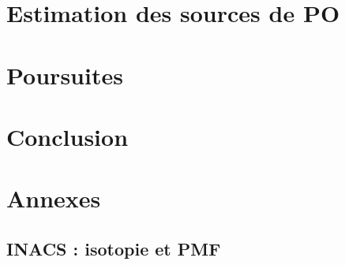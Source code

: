 \documentclass[a4paper,11pt]{book}
\begin{document}
\chapter{Estimation des sources de PO}
\label{cha:estimation_des_sources_de_PO}
\PartialToc
\clearpage

\clearpage
\printbibliography[segment=\therefsegment,heading=subbibliography]

\chapter{Poursuites}
\label{cha:travaux_futur}
\PartialToc
\clearpage

\clearpage
\printbibliography[segment=\therefsegment,heading=subbibliography]

\chapter*{Conclusion}%
\label{cha:conclusion}


\clearpage

\printbibliography



\chapter*{Annexes}
\PartialToc

\setcounter{table}{0}
\setcounter{figure}{0}
\setcounter{equation}{0}
\renewcommand{\thetable}{\thesection-\arabic{table}}
\renewcommand{\thefigure}{\thesection-\arabic{figure}}
\renewcommand{\theequation}{\thesection-\arabic{equation}}

\clearpage
\section{INACS : isotopie et PMF}%
\label{annexe:INACS}

\end{document}
